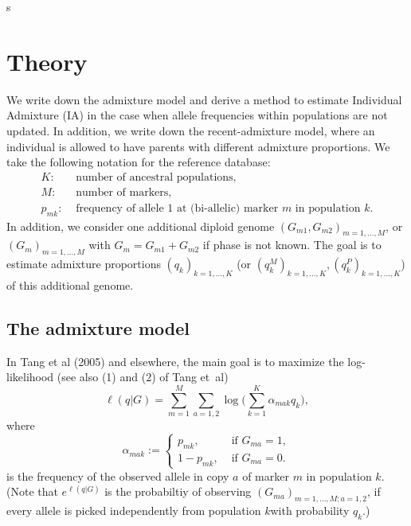 \documentclass[12pt]{article}
\theoremstyle{definition}
\begin{document}
\renewcommand{\theequation}{S\arabic{equation}}
\renewcommand{\thefigure}{S\arabic{figure}}
\renewcommand{\thetable}{S\arabic{table}}s
\renewcommand{\thesection}{S\arabic{section}}


\section{Theory}
We write down the admixture model and derive a method to estimate
Individual Admixture (IA) in the case when allele frequencies within
populations are not updated. In addition, we write down the
recent-admixture model, where an individual is allowed to have parents
with different admixture proportions. We take the following notation
for the reference database:
\begin{align*}
  K: & \text{ number of ancestral populations,}
  \\ M: & \text{ number of markers,}
  \\ p_{mk}: & \text{ frequency of allele 1 at (bi-allelic) marker $m$ in population $k$.}
\end{align*}
In addition, we consider one additional diploid genome
$(G_{m1}, G_{m2})_{m=1,...,M}$, or $(G_m)_{m=1,...,M}$ with
$G_m = G_{m1} + G_{m2}$ if phase is not known. The goal is to estimate
admixture proportions $(q_k)_{k=1,...,K}$ (or
$(q^M_{k})_{k=1,...,K}, (q^P_{k})_{k=1,...,K}$) of this additional
genome.

\subsection{The admixture model}
In Tang et al (2005) and elsewhere, the main goal is to maximize the
log-likelihood (see also (1) and (2) of Tang et~al)
$$ \ell(q|G) = \sum_{m=1}^M \sum_{a=1,2} \log\Big(\sum_{k=1}^K \alpha_{mak}q_k\Big),$$
where
$$\alpha_{mak} := \begin{cases} p_{mk}, & \text{ if }G_{ma}=1,\\ 1-p_{mk}, & \text{ if }G_{ma}=0.\end{cases}$$
is the frequency of the observed allele in copy $a$ of marker $m$ in
population $k$. (Note that $e^{\ell(q|G)}$ is the probabiltiy of
observing $(G_{ma})_{m=1,...,M; a=1,2}$, if every allele is picked
independently from population $k$with probability $q_k$.)
\end{document}
